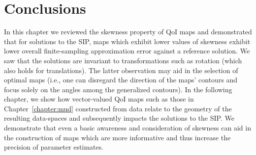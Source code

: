 
% 

% 
%
% 

\section{Conclusions}
In this chapter we reviewed the skewness property of QoI maps and demonstrated that for solutions to the SIP, maps which exhibit lower values of skewness exhibit lower overall finite-sampling approximation error against a reference solution.
We saw that the solutions are invariant to transformations such as rotation (which also holds for translations).
The latter observation may aid in the selection of optimal maps (i.e., one can disregard the direction of the maps' contours and focus solely on the angles among the generalized contours).
In the following chapter, we show how vector-valued QoI maps such as those in Chapter~\ref{chapter:mud} constructed from data relate to the geometry of the resulting data-spaces and subsequently impacts the solutions to the SIP.
We demonstrate that even a basic awareness and consideration of skewness can aid in the construction of maps which are more informative and thus increase the precision of parameter estimates.

\FloatBarrier
